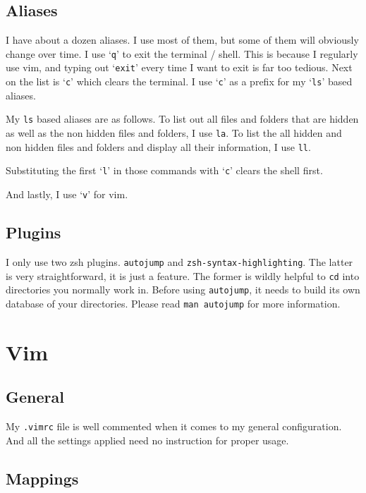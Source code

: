 \documentclass[12pt, a4paper]{article}
\begin{document}
\subsection{Aliases}

I have about a dozen aliases.
I use most of them, but some of them will obviously change over time.
I use `\texttt{q}' to exit the terminal / shell.
This is because I regularly use vim, and typing out `\texttt{exit}' every time I want to exit is far too tedious.
Next on the list is `\texttt{c}' which clears the terminal.
I use `\texttt{c}' as a prefix for my `\texttt{ls}' based aliases.

My \texttt{ls} based aliases are as follows.
To list out all files and folders that are hidden as well as the non hidden files and folders, I use \texttt{la}.
To list the all hidden and non hidden files and folders and display all their information, I use \texttt{ll}.

Substituting the first `\texttt{l}' in those commands with `\texttt{c}' clears the shell first.

And lastly, I use `\texttt{v}' for vim.

\subsection{Plugins}

I only use two zsh plugins.
\texttt{autojump} and \texttt{zsh-syntax-highlighting}.
The latter is very straightforward, it is just a feature.
The former is wildly helpful to \texttt{cd} into directories you normally work in.
Before using \texttt{autojump}, it needs to build its own database of your directories.
Please read \texttt{man autojump} for more information.

\section{Vim}

\subsection{General}
My \texttt{.vimrc} file is well commented when it comes to my general configuration.
And all the settings applied need no instruction for proper usage.

\subsection{Mappings}
\end{document}
